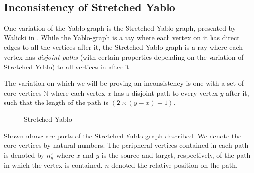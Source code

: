 \subsection{Inconsistency of Stretched Yablo}
\label{sub:Inconsistency of Stretched Yablo}

One variation of the Yablo-graph is the Stretched Yablo-graph, presented by Walicki in \cite{michal-completeness}.
While the Yablo-graph is a ray where each vertex on it has direct edges to all the vertices after it, the Stretched Yablo-graph is a ray where each vertex has \textit{disjoint paths} (with certain properties depending on the variation of Stretched Yablo) to all vertices in after it.

The variation on which we will be proving an inconsistency is one with a set of core vertices $\mathbb{N}$ where each vertex $x$ has a disjoint path to every vertex $y$ after it, such that the length of the path is $(2 \times (y - x) - 1)$.

\begin{figure}[!h]
  \centering
  \caption{Stretched Yablo}
  \label{fig:stretched_yablo}
\end{figure}
Shown above are parts of the Stretched Yablo-graph described.
We denote the core vertices by natural numbers.
The peripheral vertices contained in each path is denoted by $n^x_y$ where $x$ and $y$ is the source and target, respectively, of the path in which the vertex is contained.
$n$ denoted the relative position on the path.

